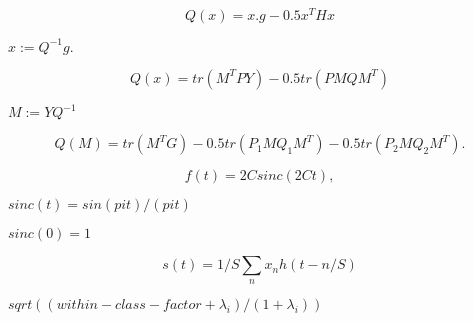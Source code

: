 \documentclass{article}
\begin{document}
\[ Q(x) = x.g - 0.5 x^T H x \]
\pagebreak

$ x := Q^{-1} g. $
\pagebreak

\[ Q(x) = tr(M^T P Y) - 0.5 tr(P M Q M^T) \]
\pagebreak

$ M := Y Q^{-1} $
\pagebreak

\[ Q(M) = tr(M^T G) -0.5 tr(P_1 M Q_1 M^T) -0.5 tr(P_2 M Q_2 M^T). \]
\pagebreak

\[ f(t) = 2C sinc(2Ct), \]
\pagebreak

$ sinc(t) = sin(pi t) / (pi t) $
\pagebreak

$ sinc(0) = 1 $
\pagebreak

\[ s(t) = 1/S \sum_n x_n h(t - n/S) \]
\pagebreak

$ sqrt( (within-class-factor + \lambda_i) / (1 + \lambda_i) ) $
\pagebreak
\end{document}
